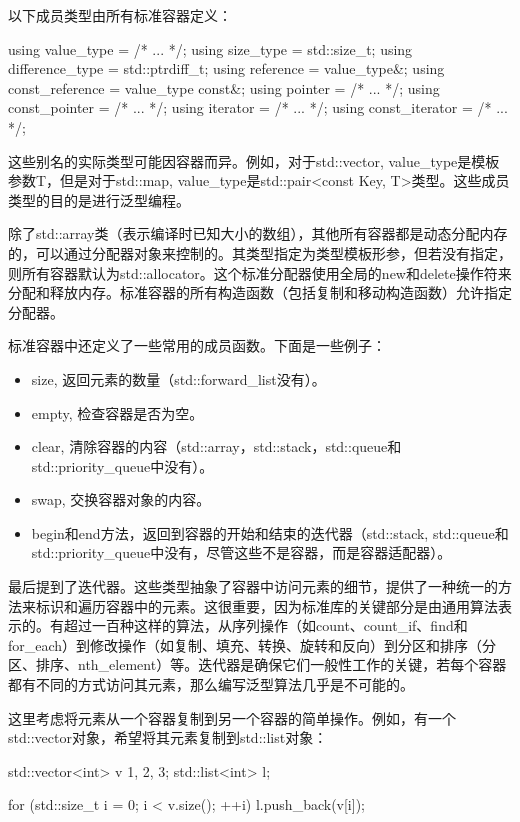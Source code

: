 以下成员类型由所有标准容器定义：

\begin{cppcode}
using value_type = /* ... */;
using size_type = std::size_t;
using difference_type = std::ptrdiff_t;
using reference = value_type&;
using const_reference = value_type const&;
using pointer = /* ... */;
using const_pointer = /* ... */;
using iterator = /* ... */;
using const_iterator = /* ... */;
\end{cppcode}

这些别名的实际类型可能因容器而异。例如，对于std::vector, value_type是模板参数T，但是对于std::map, value_type是std::pair<const Key, T>类型。这些成员类型的目的是进行泛型编程。

除了std::array类（表示编译时已知大小的数组），其他所有容器都是动态分配内存的，可以通过分配器对象来控制的。其类型指定为类型模板形参，但若没有指定，则所有容器默认为std::allocator。这个标准分配器使用全局的new和delete操作符来分配和释放内存。标准容器的所有构造函数（包括复制和移动构造函数）允许指定分配器。

标准容器中还定义了一些常用的成员函数。下面是一些例子：

\begin{itemize}
  \item size, 返回元素的数量（std::forward_list没有）。
  \item empty, 检查容器是否为空。
  \item clear, 清除容器的内容（std::array，std::stack，std::queue和std::priority_queue中没有）。
  \item swap, 交换容器对象的内容。
  \item begin和end方法，返回到容器的开始和结束的迭代器（std::stack, std::queue和std::priority_queue中没有，尽管这些不是容器，而是容器适配器）。
\end{itemize}

最后提到了迭代器。这些类型抽象了容器中访问元素的细节，提供了一种统一的方法来标识和遍历容器中的元素。这很重要，因为标准库的关键部分是由通用算法表示的。有超过一百种这样的算法，从序列操作（如count、count_if、find和for_each）到修改操作（如复制、填充、转换、旋转和反向）到分区和排序（分区、排序、nth_element）等。迭代器是确保它们一般性工作的关键，若每个容器都有不同的方式访问其元素，那么编写泛型算法几乎是不可能的。

这里考虑将元素从一个容器复制到另一个容器的简单操作。例如，有一个std::vector对象，希望将其元素复制到std::list对象：

\begin{cppcode}
std::vector<int> v {1, 2, 3};
std::list<int> l;

for (std::size_t i = 0; i < v.size(); ++i)
	l.push_back(v[i]);
\end{cppcode}

